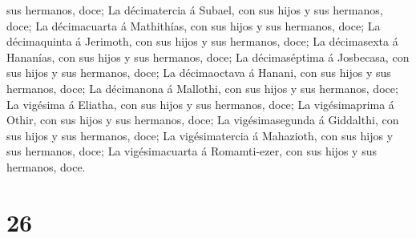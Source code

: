 sus hermanos, doce;  La décimatercia á Subael, con sus
hijos y sus hermanos, doce;  La décimacuarta á
Mathithías, con sus hijos y sus hermanos, doce;  La
décimaquinta á Jerimoth, con sus hijos y sus hermanos, doce;
 La décimasexta á Hananías, con sus hijos y sus hermanos,
doce;  La décimaséptima á Josbecasa, con sus hijos y sus
hermanos, doce;  La décimaoctava á Hanani, con sus hijos
y sus hermanos, doce;  La décimanona á Mallothi, con sus
hijos y sus hermanos, doce;  La vigésima á Eliatha, con
sus hijos y sus hermanos, doce;  La vigésimaprima á
Othir, con sus hijos y sus hermanos, doce;  La
vigésimasegunda á Giddalthi, con sus hijos y sus hermanos, doce;
 La vigésimatercia á Mahazioth, con sus hijos y sus
hermanos, doce;  La vigésimacuarta á Romamti-ezer, con
sus hijos y sus hermanos, doce.

\hypertarget{section-25}{%
\section{26}\label{section-25}}

